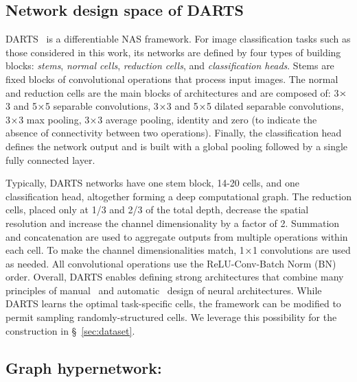 \subsection{Network design space of DARTS\label{sec:bg_darts}}

DARTS~\citep{liu2018darts} is a differentiable NAS framework. For image classification tasks such as those considered in this work, its networks are defined by four types of building blocks: \emph{stems}, \emph{normal cells},  \emph{reduction cells}, and \emph{classification heads}. Stems are fixed blocks of convolutional operations that process input images. 
The normal and reduction cells are the main blocks of architectures and are composed of: 
3${\mkern-0.1mu\times\mkern-0.1mu}$3 and 5${\mkern-0.1mu\times\mkern-0.1mu}$5 separable convolutions,
3${\mkern-0.1mu\times\mkern-0.1mu}$3 and 5${\mkern-0.1mu\times\mkern-0.1mu}$5 dilated separable convolutions, 
3${\mkern-0.1mu\times\mkern-0.1mu}$3 max pooling,  3${\mkern-0.1mu\times\mkern-0.1mu}$3 average pooling, identity and zero (to indicate the absence of connectivity between two operations). Finally, the classification head defines the network output and is built with a global pooling followed by a single fully connected layer.

Typically, DARTS networks have one stem block, 14-20 cells, and one classification head, altogether forming a deep computational graph. The reduction cells, placed only at 1/3 and 2/3 of the total depth, decrease the spatial resolution and increase the channel dimensionality by a factor of 2. Summation and concatenation are used to aggregate outputs from multiple operations within each cell. To make the channel dimensionalities match, 1${\mkern-0.1mu\times\mkern-0.1mu}$1 convolutions are used as needed. All convolutional operations use the ReLU-Conv-Batch Norm (BN)~\citep{ioffe2015batch} order. Overall, DARTS enables defining strong architectures that combine many principles of manual~\citep{simonyan2014very,he2016deep,xie2017aggregated,huang2017densely} and automatic~\citep{zhang2018graph,zoph2016neural,zoph2018learning,liu2018progressive,real2019regularized,chen2019progressive,howard2019searching} design of neural architectures. While DARTS learns the optimal task-specific cells, the framework can be modified to permit sampling randomly-structured cells. We leverage this possibility for the \dataset construction in \S~\ref{sec:dataset}.


\subsection{Graph hypernetwork: \ghnbase\label{sec:bg_ghn}}

